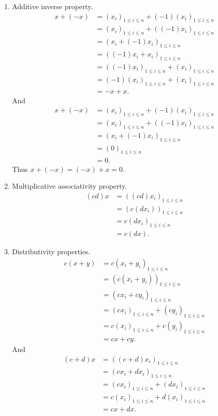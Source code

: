 \documentclass{book}
\begin{document}
\begin{enumerate}
    \item Additive inverse property.
        \begin{align*}
            x+(-x)&=(x_i)_{1\leq i\leq n}+(-1)(x_i)_{1\leq i\leq n}\\
            &=(x_i)_{1\leq i\leq n}+((-1)x_i)_{1\leq i\leq n}\\
            &=(x_i+(-1)x_i)_{1\leq i\leq n}\\
            &=((-1)x_i+x_i)_{1\leq i\leq n}\\
            &=((-1)x_i)_{1\leq i\leq n}+(x_i)_{1\leq i\leq n}\\
            &=(-1)(x_i)_{1\leq i\leq n}+(x_i)_{1\leq i\leq n}\\
            &=-x+x.
        \end{align*}
    And
        \begin{align*}
            x+(-x)&=(x_i)_{1\leq i\leq n}+(-1)(x_i)_{1\leq i\leq n}\\
            &=(x_i)_{1\leq i\leq n}+((-1)x_i)_{1\leq i\leq n}\\
            &=(x_i+(-1)x_i)_{1\leq i\leq n}\\
            &=(0)_{1\leq i\leq n}\\
            &=0.
        \end{align*}
    Thus $x+(-x)=(-x)+x=0$.

    \item Multiplicative associativity property.
        \begin{align*}
            (cd)x&=((cd)x_i)_{1\leq i\leq n}\\
            &=(c(dx_i))_{1\leq i\leq n}\\
            &=c(dx_i)_{1\leq i\leq n}\\
            &=c(dx).
        \end{align*}

    \item Distributivity properties.
        \begin{align*}
            c(x+y)&=c(x_i+y_i)_{1\leq i\leq n}\\
            &=(c(x_i+y_i))_{1\leq i\leq n}\\
            &=(cx_i+cy_i)_{1\leq i\leq n}\\
            &=(cx_i)_{1\leq i\leq n}+(cy_i)_{1\leq i\leq n}\\
            &=c(x_i)_{1\leq i\leq n}+c(y_i)_{1\leq i\leq n}\\
            &=cx+cy.
        \end{align*}
    And
        \begin{align*}
            (c+d)x&=((c+d)x_i)_{1\leq i\leq n}\\
            &=(cx_i+dx_i)_{1\leq i\leq n}\\
            &=(cx_i)_{1\leq i\leq n}+(dx_i)_{1\leq i\leq n}\\
            &=c(x_i)_{1\leq i\leq n}+d(x_i)_{1\leq i\leq n}\\
            &=cx+dx.
        \end{align*}


\end{enumerate}
\end{document}
